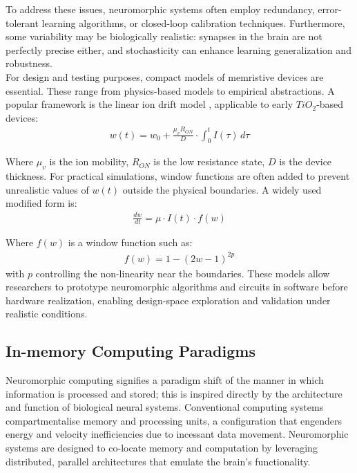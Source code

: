 \noindent To address these issues, neuromorphic systems often employ redundancy, error-tolerant learning algorithms, or closed-loop calibration techniques. Furthermore, some variability may be biologically realistic: synapses in the brain are not perfectly precise either, and stochasticity can enhance learning generalization and robustness.\\

\noindent For design and testing purposes, compact models of memristive devices are essential. These range from physics-based models to empirical abstractions. A popular framework is the linear ion drift model \cite{cai2011abel}, applicable to early $TiO_2$-based devices:
\begin{align}
    w(t) = w_0 + \frac{\mu_vR_{ON}}{D} \cdot \int_{0}^{t} I(\tau)   \,d\tau  \label{eq:1.27}
\end{align}

\noindent Where $\mu_v$ is the ion mobility, $R_{ON}$ is the low resistance state, $D$ is the device thickness. For practical simulations, window functions are often added to prevent unrealistic values of $w(t)$ outside the physical boundaries. A widely used modified form is:
\begin{align}
    \frac{dw}{dt} = \mu \cdot I(t) \cdot f(w) \label{eq:1.28}
\end{align}

\noindent Where $f(w)$ is a window function such as:
\begin{align}
    f(w) = 1 - (2w - 1)^{2p} \label{eq:1.29}
\end{align}
\noindent with $p$ controlling the non-linearity near the boundaries. These models allow researchers to prototype neuromorphic algorithms and circuits in software before hardware realization, enabling design-space exploration and validation under realistic conditions.


\subsection[In-memory Computing Paradigms]{In-memory Computing Paradigms}

\noindent Neuromorphic computing signifies a paradigm shift of the manner in which information is processed and stored; this is inspired directly by the architecture and function of biological neural systems. Conventional computing systems compartmentalise memory and processing units, a configuration that engenders energy and velocity inefficiencies due to incessant data movement. Neuromorphic systems are designed to co-locate memory and computation by leveraging distributed, parallel architectures that emulate the brain's functionality.\\


